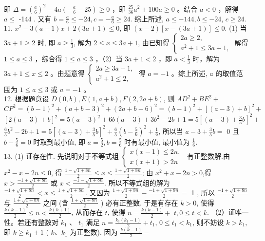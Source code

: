 \documentclass[10pt]{article}
\begin{document}
即 $\Delta=\left(\frac{a}{6}\right)^{2}-4 a\left(-\frac{a}{6}-25\right) \geqslant 0$ ，即 $\frac{25}{36} a^{2}+100 a \geqslant 0$ 。结合 $a<0$ ，解得 $a \leqslant$ -144 . 又有 $b=\frac{a}{6} \leqslant-24, c=-\frac{a}{6} \geqslant 24$. 综上所述, $a \leqslant-144, b \leqslant-24$, $c \geqslant 24$.\\
11. $x^{2}-3(a+1) x+2(3 a+1) \leqslant 0$, 即 $(x-2)[x-(3 a+1)] \leqslant 0$. (1) 当 $3 a+1 \geqslant 2$ 时, 即 $a \geqslant \frac{1}{3}$, 解为 $2 \leqslant x \leqslant 3 a+1$, 由已知得 $\left\{\begin{array}{l}2 a \geqslant 2, \\ a^{2}+1 \leqslant 3 a+1,\end{array}\right.$ 解得 $1 \leqslant a \leqslant 3$ ，综合得 $1 \leqslant a \leqslant 3$ ，（2）当 $3 a+1<2$ ，即 $a<\frac{1}{3}$ 时，解为 $3 a+1 \leqslant x \leqslant 2$ 。由题意得 $\left\{\begin{array}{l}2 a \geqslant 3 a+1, \\ a^{2}+1 \leqslant 2,\end{array}\right.$ 得 $a=-1$ 。综上所述, $a$ 的取值范围为 $1 \leqslant a \leqslant 3$ 或 $a=-1$ 。\\
12. 根据题意设 $D(0, b), E(1, a+b), F(2,2 a+b)$, 则 $A D^{2}+B E^{2}+$ $C F^{2}=(b-1)^{2}+(a+b-3)^{2}+(2 a+b-6)^{2}=(b-1)^{2}+[(a-3)+b]^{2}+$ $[2(a-3)+b]^{2}=5(a-3)^{2}+6 b(a-3)+3 b^{2}-2 b+1=5\left[(a-3)+\frac{3}{5} b\right]^{2}+$ $\frac{6}{5} b^{2}-2 b+1=5\left[(a-3)+\frac{3}{5} b\right]^{2}+\frac{6}{5}\left(b-\frac{5}{6}\right)^{2}+\frac{1}{6}$, 所以当 $a-3+\frac{3}{5} b=$ 0 且 $b-\frac{5}{6}=0$ 时取到最小值, 即 $a=\frac{5}{2}, b=\frac{5}{6}$ 时有最小值, 最小值为 $\frac{1}{6}$.\\
13. (1) 证存在性. 先说明对于不等式组 $\left\{\begin{array}{l}x(x-1) \leqslant 2 n \text {, } \\ x(x+1)>2 n\end{array}\right.$ 有正整数解.由 $x^{2}-x-2 n \leqslant 0$, 得 $\frac{1-\sqrt{1+8 n}}{2} \leqslant x \leqslant \frac{1+\sqrt{1+8 n}}{2}$; 由 $x^{2}+x-2 n>0$,得 $x>\frac{-1+\sqrt{1+8 n}}{2}$ 或 $x<\frac{-1-\sqrt{1+8 n}}{2}$. 所以不等式组的解为 $\frac{-1+\sqrt{1+8 n}}{2}<x \leqslant \frac{1+\sqrt{1+8 n}}{2}$. 又因为 $\frac{1+\sqrt{1+8 n}}{2}-\frac{-1+\sqrt{1+8 n}}{2}=$ 1 , 所以 $\frac{-1+\sqrt{1+8 n}}{2}$ 与 $\frac{1+\sqrt{1+8 n}}{2}$ 之间 (含 $\frac{1+\sqrt{1+8 n}}{2}$ ) 必有正整数. 于是有存在 $k>0$, 使得 $\frac{k(k-1)}{2} \leqslant n<\frac{k(k+1)}{2}$, 从而存在 $t$, 使得 $n=\frac{k(k-1)}{2}+$ $t, 0 \leqslant t<k$. （2）证唯一性。若还有整数对 $k_{1}$ 、 $t_{1}$ 满足 $n=\frac{k_{1}\left(k_{1}-1\right)}{2}+t_{1}$, $0 \leqslant t_{1}<k_{1}$, 则不妨设 $k>k_{1}$, 即 $k \geqslant k_{1}+1$ ( $k 、 k_{1}$ 为正整数). 因为 $\frac{k(k-1)}{2}-$\\
\end{document}
